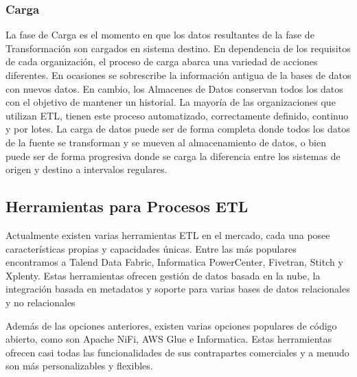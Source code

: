 \subsubsection{Carga}

La fase de Carga es el momento en que los datos resultantes de la fase de Transformaci\'on son cargados en sistema destino. 
En dependencia de los requisitos de cada organización, el proceso de carga abarca una variedad de acciones diferentes. 
En ocasiones se sobrescribe la información antigua de la bases de datos con nuevos datos. En cambio, los Almacenes de Datos 
conservan todos los datos con el objetivo de mantener un historial. La mayoría de las organizaciones que utilizan ETL, 
tienen este proceso automatizado, correctamente definido, continuo y por lotes\cite{ETL_amazon}. La carga de datos puede
ser de forma completa donde todos los datos de la fuente se transforman y se mueven al almacenamiento de datos, o bien 
puede ser de forma progresiva donde se carga la diferencia entre los sistemas de origen y destino a intervalos regulares.

\subsection{Herramientas para Procesos ETL}

Actualmente existen varias herramientas ETL en el mercado, cada una posee características propias y capacidades \'unicas. 
Entre las m\'as populares encontramos a Talend Data Fabric, Informatica PowerCenter, Fivetran, Stitch y Xplenty. Estas 
herramientas ofrecen gestión de datos basada en la nube, la integración basada en metadatos y soporte para varias bases 
de datos relacionales y no relacionales

Además de las opciones anteriores, existen varias opciones populares de c\'odigo abierto, como son Apache NiFi, AWS Glue 
e Informatica. Estas herramientas ofrecen casi todas las funcionalidades de sus contrapartes comerciales y a menudo 
son m\'as personalizables y flexibles.